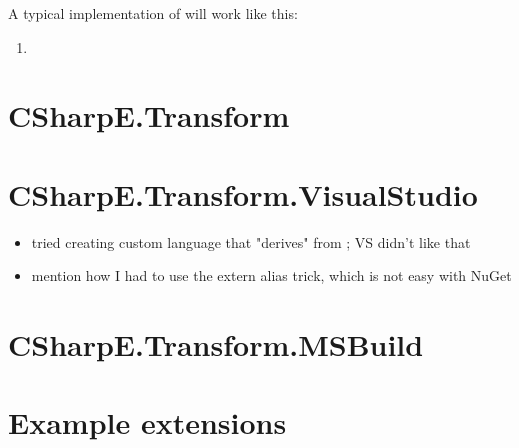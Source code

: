 A typical implementation of  will work like this:

\begin{enumerate}
\item 
\end{enumerate}

\section{CSharpE.Transform}

\section{CSharpE.Transform.VisualStudio}

\begin{itemize}
\item tried creating custom language that "derives" from ; VS didn't like that
\item mention how I had to use the extern alias trick, which is not easy with NuGet
\end{itemize}

\section{CSharpE.Transform.MSBuild}

\section{Example extensions}